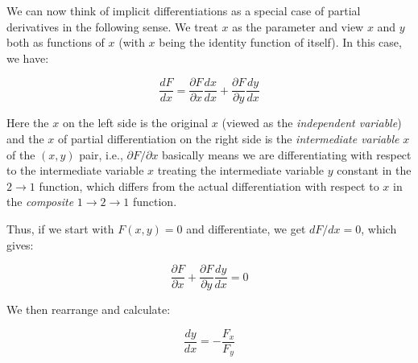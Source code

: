 \documentclass[10pt]{amsart}
\begin{document}
We can now think of implicit differentiations as a special case of
partial derivatives in the following sense. We treat $x$ as the
parameter and view $x$ and $y$ both as functions of $x$ (with $x$
being the identity function of itself). In this case, we have:

$$\frac{dF}{dx} = \frac{\partial F}{\partial x}\frac{dx}{dx} + \frac{\partial F}{\partial y} \frac{dy}{dx}$$

Here the $x$ on the left side is the original $x$ (viewed as the {\em
independent variable}) and the $x$ of partial differentiation on the
right side is the {\em intermediate variable} $x$ of the $(x,y)$ pair,
i.e., $\partial F/\partial x$ basically means we are differentiating
with respect to the intermediate variable $x$ treating the
intermediate variable $y$ constant in the $2 \to 1$ function, which
differs from the actual differentiation with respect to $x$ in the
{\em composite} $1 \to 2 \to 1$ function.

Thus, if we start with $F(x,y) = 0$ and differentiate, we get $dF/dx =
0$, which gives:

$$\frac{\partial F}{\partial x} + \frac{\partial F}{\partial y} \frac{dy}{dx} = 0$$

We then rearrange and calculate:

$$\frac{dy}{dx} = - \frac{F_x}{F_y}$$
\end{document}
